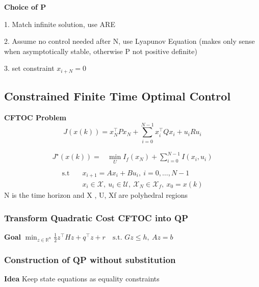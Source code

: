\textbf{Choice of P}

1. Match infinite solution, use ARE

2. Assume no control needed after N, use Lyapunov Equation %
(makes only sense when asymptotically stable, otherwise P not positive definite)

3. set constraint $x_{i+N}=0$

\subsection{Constrained Finite Time Optimal Control
}

\begin{sstTitleBox}[ForestGreen]{\textbf{\large
			CFTOC Problem
		}
	}
	\[
		J(x(k)) = x_N^\top P x_N + \sum_{i=0}^{N-1}x_i^\top Q x_i + u_i R u_i
	\]
	\begin{centering}
		\[ \begin{aligned}
				J^\star (x(k)) = & \min_{U}  I_f(x_N) + \sum_{i=0}^{N-1} I(x_{i}, u_{i}) \\
			\end{aligned} \]
		\[ \begin{aligned}
				\text{s.t} \quad & x_{i+1} = A x_{i} + Bu_{i},\ i = 0,\dots,N-1                                                  \\
				                 & x_{i} \in \mathcal{X},\ u_{i} \in \mathcal{U},\ \mathcal{X}_N \in \mathcal{X}_f, \ x_0 = x(k)
			\end{aligned} \]
		N is the time horizon and X , U, Xf are polyhedral regions
	\end{centering}
\end{sstTitleBox}

\subsubsection{Transform Quadratic Cost CFTOC into QP}

\textbf{Goal}
$\min_{z\in\mathbb{R}^n}
	\textstyle\frac{1}{2}z^\top H z + q^\top z + r
	\quad\text{s.t. }Gz\leq h,\ Az = b$


\subsubsection{Construction of QP without substitution}

\textbf{Idea} Keep state equations as equality constraints

